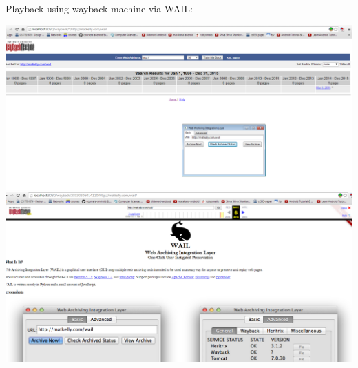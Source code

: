 \documentclass[paper=a4, fontsize=11pt]{scrartcl} %
\numberwithin{equation}{section} %
\numberwithin{figure}{section} %
\numberwithin{table}{section} %
\begin{document}
Playback using wayback machine via WAIL:
\begin{center}
\includegraphics[scale=.4]{way1.png}
\includegraphics[scale=.4]{way2.png}
\end{center}















\end{document}
